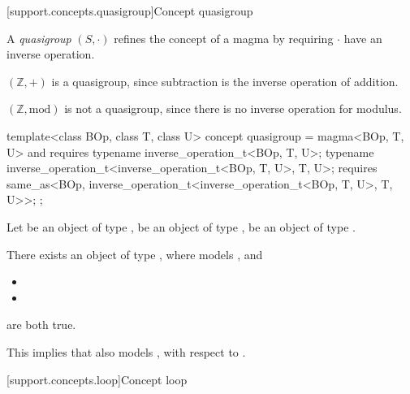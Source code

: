[support.concepts.quasigroup]{Concept quasigroup}

\pnum
A \textit{quasigroup} $(S, \cdot)$ refines the concept of a magma by requiring $\cdot$ have an
inverse operation.

\begin{example}
   $(\mathbb{Z}, +)$ is a quasigroup, since subtraction is the inverse operation of addition.
\end{example}

\begin{example}
   $(\mathbb{Z}, \text{mod})$ is not a quasigroup, since there is no inverse operation for modulus.
\end{example}

\begin{itemdecl}
  template<class BOp, class T, class U>
  concept quasigroup = magma<BOp, T, U> and requires {
     typename inverse_operation_t<BOp, T, U>;
     typename inverse_operation_t<inverse_operation_t<BOp, T, U>, T, U>;
     requires same_as<BOp, inverse_operation_t<inverse_operation_t<BOp, T, U>, T, U>>;
  };
\end{itemdecl}
\begin{itemdescr}
   \pnum
   Let  be an object of type ,  be an object of type ,
    be an object of type .

   \pnum
   There exists an object  of type , where  models
   , and
   \begin{itemize}
      \item {}
      \item {}
   \end{itemize}
   are both true.
   \begin{note}
      This implies that  also models , with respect to
      .
   \end{note}
\end{itemdescr}


[support.concepts.loop]{Concept loop}


